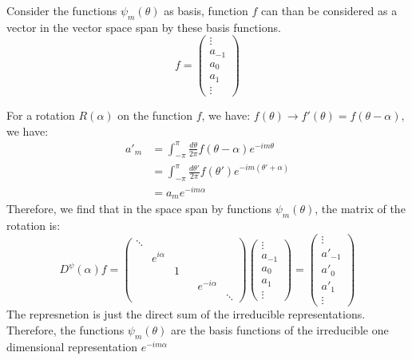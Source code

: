 \documentclass{amsart}
\theoremstyle{remark}
\theoremstyle{remark}
\theoremstyle{definition}
\begin{document}
Consider the functions $\psi_m (\theta)$ as basis, function $f$ can than be considered 
as a vector in the vector space span by these basis functions. 
\begin{equation*}
    f = \left(\begin{matrix}
        \vdots \\ a_{-1} \\ a_0 \\ a_1 \\ \vdots
    \end{matrix}\right)
\end{equation*}

For a rotation $R(\alpha)$ on the function $f$, we have: $f(\theta) \to f'(\theta) = f(\theta - \alpha)$,
we have:
\begin{align*}
    a'_m &= \int_{-\pi}^{\pi} \frac{d\theta}{2\pi} f(\theta - \alpha) e^{-im\theta} \\
    &= \int_{-\pi}^{\pi} \frac{d\theta'}{2\pi} f(\theta') e^{-im(\theta' + \alpha)} \\
    &= a_m e^{-im\alpha}
\end{align*}
Therefore, we find that in the space span by functions $\psi_m(\theta)$, the matrix of the 
rotation is:
\begin{equation*}
    D^{\psi}(\alpha)f = 
    \left(
        \begin{matrix}
            \ddots & & & & & \\
                   & e^{i\alpha} & & & &\\
                                &  & 1& & &\\
                                 & & &     & e^{-i\alpha} & \\
                                 & & & & & \ddots
        \end{matrix}
    \right)\left(\begin{matrix}
        \vdots \\ a_{-1} \\ a_0 \\ a_1 \\ \vdots
    \end{matrix}\right) = \left(\begin{matrix}
        \vdots \\ a'_{-1} \\ a'_0 \\ a'_1 \\ \vdots
    \end{matrix}\right)
\end{equation*}
The represnetion is just the direct sum of the irreducible representations. Therefore, the functions $\psi_m(\theta)$
are the basis functions of the irreducible one dimensional representation $e^{-im\alpha}$
\end{document}
